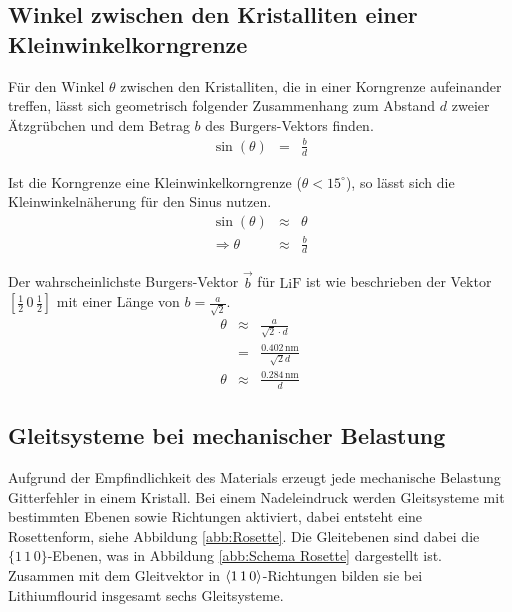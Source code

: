 \documentclass[12pt,a4paper]{scrartcl}
\numberwithin{equation}{section} %
\begin{document}
\hypertarget{winkel-zwischen-den-kristalliten-einer-kleinwinkelkorngrenze}{%
\subsection{Winkel zwischen den Kristalliten einer
Kleinwinkelkorngrenze}\label{winkel-zwischen-den-kristalliten-einer-kleinwinkelkorngrenze}}

Für den Winkel $\theta$ zwischen den Kristalliten, die in einer
Korngrenze aufeinander treffen, lässt sich geometrisch folgender
Zusammenhang zum Abstand $d$ zweier Ätzgrübchen und dem Betrag $b$ des Burgers-Vektors finden.
\begin{eqnarray}
    \sin(\theta) &=& \frac{b}{d}
\end{eqnarray}

\noindent
Ist die Korngrenze eine Kleinwinkelkorngrenze ($\theta < 15^\circ$), so lässt sich die Kleinwinkelnäherung für den Sinus nutzen.
\begin{eqnarray}
    \sin(\theta) &\approx& \theta \\
    \Rightarrow \theta &\approx& \frac{b}{d}
\end{eqnarray}

\noindent
Der wahrscheinlichste Burgers-Vektor $\vec{b}$ für $\mathrm{LiF}$ ist wie beschrieben der Vektor $[\frac{1}{2}\,0\,\frac{1}{2}]$ mit einer Länge von $b = \frac{a}{\sqrt{2}}$.
\begin{eqnarray}
    \theta &\approx& \frac{a}{\sqrt{2} \cdot d} \\
        &=& \frac{0.402\,\mathrm{nm}}{\sqrt{2} d}\\
    \theta &\approx& \frac{0.284\,\mathrm{nm}}{d} \label{theta}
\end{eqnarray}

\hypertarget{gleitsysteme-bei-mechanischer-belastung}{%
\subsection{Gleitsysteme bei mechanischer
Belastung}\label{gleitsysteme-bei-mechanischer-belastung}}

Aufgrund der Empfindlichkeit des Materials erzeugt jede mechanische
Belastung Gitterfehler in einem Kristall. Bei einem Nadeleindruck werden
Gleitsysteme mit bestimmten Ebenen sowie Richtungen aktiviert, dabei
entsteht eine Rosettenform, siehe Abbildung \ref{abb:Rosette}. Die Gleitebenen sind dabei die $\lbrace1\,1\,0\rbrace$-Ebenen, was in Abbildung \ref{abb:Schema Rosette} dargestellt ist. Zusammen mit dem Gleitvektor in $\expval{1\,1\,0}$-Richtungen bilden sie bei Lithiumflourid insgesamt sechs Gleitsysteme.
\end{document}
